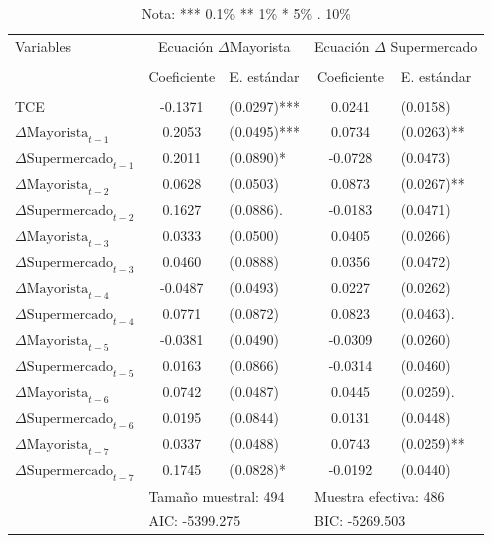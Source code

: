 \documentclass[border=3mm,preview]{standalone}
\numberwithin{equation}{section}
\begin{document}
\centering
\begin{varwidth}{\linewidth}
\begin{table}
\begin{tabular}{@{}lclcl@{}}
\toprule 
\multicolumn{1}{l}{Variables} & \multicolumn{2}{c}{Ecuación $\Delta$Mayorista} & \multicolumn{2}{c}{Ecuación $\Delta$ Supermercado} \\  
\cmidrule(l){2-3} \cmidrule(l){4-5} \\
 & Coeficiente & E. estándar & Coeficiente & E. estándar \\
 \cmidrule(l){2-5} \\
TCE & -0.1371 & (0.0297)*** & 0.0241 & (0.0158) \\
$\Delta \text{Mayorista}_{t-1}$ & 0.2053 & (0.0495)*** & 0.0734 & (0.0263)** \\
$\Delta \text{Supermercado}_{t-1}$ & 0.2011 & (0.0890)* & -0.0728 & (0.0473) \\ 
$\Delta \text{Mayorista}_{t-2}$ & 0.0628 & (0.0503) & 0.0873 & (0.0267)** \\
$\Delta \text{Supermercado}_{t-2}$ & 0.1627 & (0.0886). & -0.0183 & (0.0471) \\
$\Delta \text{Mayorista}_{t-3}$ & 	0.0333 & (0.0500) & 0.0405 & (0.0266) \\ 
$\Delta \text{Supermercado}_{t-3}$ & 0.0460 & (0.0888)  & 0.0356 & (0.0472) \\
$\Delta \text{Mayorista}_{t-4}$ & -0.0487 & (0.0493) & 0.0227 & (0.0262) \\ 
$\Delta \text{Supermercado}_{t-4}$ & 0.0771 & (0.0872)  & 0.0823 & (0.0463). \\
$\Delta \text{Mayorista}_{t-5}$ & -0.0381 & (0.0490) & -0.0309 & (0.0260) \\ 
$\Delta \text{Supermercado}_{t-5}$ & 0.0163 & (0.0866) & -0.0314 & (0.0460) \\
$\Delta \text{Mayorista}_{t-6}$ & 0.0742 & (0.0487) & 0.0445 & (0.0259). \\ 
$\Delta \text{Supermercado}_{t-6}$ & 0.0195 & (0.0844) & 0.0131 & (0.0448) \\
$\Delta \text{Mayorista}_{t-7}$ & 0.0337 & (0.0488) & 0.0743 & (0.0259)** \\ 
$\Delta \text{Supermercado}_{t-7}$ & 0.1745 & (0.0828)* & -0.0192 & (0.0440) \\ 
\bottomrule
 & \multicolumn{2}{l}{Tamaño muestral: 494} & \multicolumn{2}{l}{Muestra efectiva: 486} \\
 &  \multicolumn{2}{l}{AIC: -5399.275} & \multicolumn{2}{l}{BIC: -5269.503} \\
 \bottomrule 
\end{tabular}
\caption*{\small Nota: *** 0.1\% ** 1\% * 5\% . 10\%  }
\end{table}
\end{varwidth}
\end{document}
